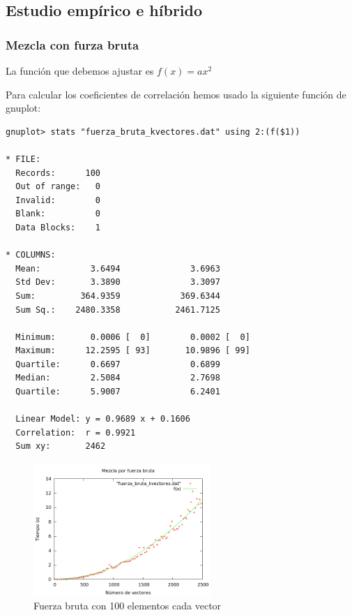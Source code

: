 \newpage

\subsection{Estudio emp\'irico e h\'ibrido}
\subsubsection{Mezcla con furza bruta}
La funci\'on que debemos ajustar es $f(x) = ax^2$

\begin{center}
\end{center}

Para calcular los coeficientes de correlaci\'on hemos usado la siguiente funci\'on de gnuplot:

\begin{lstlisting}[language=gnuplot]
gnuplot> stats "fuerza_bruta_kvectores.dat" using 2:(f($1))

* FILE: 
  Records:      100
  Out of range:   0
  Invalid:        0
  Blank:          0
  Data Blocks:    1

* COLUMNS:
  Mean:          3.6494              3.6963
  Std Dev:       3.3890              3.3097
  Sum:         364.9359            369.6344
  Sum Sq.:    2480.3358           2461.7125

  Minimum:       0.0006 [  0]        0.0002 [  0]
  Maximum:      12.2595 [ 93]       10.9896 [ 99]
  Quartile:      0.6697              0.6899
  Median:        2.5084              2.7698
  Quartile:      5.9007              6.2401

  Linear Model: y = 0.9689 x + 0.1606
  Correlation:  r = 0.9921
  Sum xy:       2462

\end{lstlisting}

\begin{figure}[htb] 
\centering
	\includegraphics[width=0.6\textwidth]{../Obligatorio/Graficas/fuerza_bruta_kvectores.png}
	\caption{Fuerza bruta con 100 elementos cada vector} 
	\label{fig:f_kvectores} 
\end{figure}

